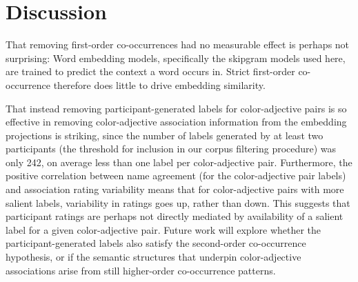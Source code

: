 \documentclass[10pt,letterpaper]{article}
\begin{document}
\section{Discussion}
That removing first-order co-occurrences had no measurable effect is perhaps not surprising: Word embedding models, specifically the skipgram models used here, are trained to predict the context a word occurs in. Strict first-order co-occurrence therefore does little to drive embedding similarity.

That instead removing participant-generated labels for color-adjective pairs is so effective in removing color-adjective association information from the embedding projections is striking, since the number of labels generated by at least two participants (the threshold for inclusion in our corpus filtering procedure) was only 242, on average less than one label per color-adjective pair. Furthermore, the positive correlation between name agreement (for the color-adjective pair labels) and association rating variability means that for color-adjective pairs with more salient labels, variability in ratings goes up, rather than down. This suggests that participant ratings are perhaps not directly mediated by availability of a salient label for a given color-adjective pair. Future work will explore whether the participant-generated labels also satisfy the second-order co-occurrence hypothesis, or if the semantic structures that underpin color-adjective associations arise from still higher-order co-occurrence patterns.
\end{document}
